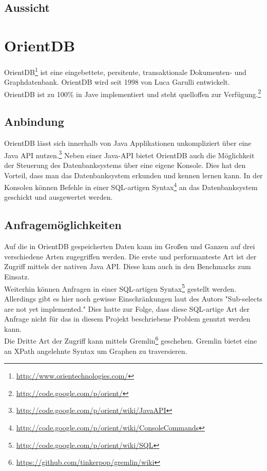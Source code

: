 \documentclass[11pt, a4paper, oneside]{article} %
\begin{document}
\subsection{Aussicht}

\section{OrientDB}

OrientDB\footnote{\url{http://www.orientechnologies.com/}} ist eine eingebettete, persitente, transaktionale Dokumenten- und Graphdatenbank. OrientDB wird seit 1998 von Luca Garulli entwickelt. OrientDB ist zu 100\% in Jave implementiert und steht quelloffen zur Verfügung.\footnote{\url{http://code.google.com/p/orient/}}

\subsection{Anbindung}

OrientDB lässt sich innerhalb von Java Applikationen unkompliziert über eine Java API nutzen.\footnote{\url{http://code.google.com/p/orient/wiki/JavaAPI}} Neben einer Java-API bietet OrientDB auch die Möglichkeit der Steuerung des Datenbanksystems über eine eigene Konsole. Dies hat den Vorteil, dass man das Datenbanksystem erkunden und kennen lernen kann. In der Konsolen können Befehle in einer SQL-artigen Syntax\footnote{\url{http://code.google.com/p/orient/wiki/ConsoleCommands}} an das Datenbanksystem geschickt und ausgewertet werden.

\subsection{Anfragemöglichkeiten}
Auf die in OrientDB gespeicherten Daten kann im Großen und Ganzen auf drei verschiedene Arten zugegriffen werden. Die erste und performanteste Art ist der Zugriff mittels der nativen Java API. Diese kam auch in den Benchmarks zum Einsatz. \\
Weiterhin können Anfragen in einer SQL-artigen Syntax\footnote{\url{http://code.google.com/p/orient/wiki/SQL}} gestellt werden. Allerdings gibt es hier noch gewisse Einschränkungen laut des Autors "Sub-selects are not yet implemented." Dies hatte zur Folge, dass diese SQL-artige Art der Anfrage nicht für das in diesem Projekt beschriebene Problem genutzt werden kann. \\
Die Dritte Art der Zugriff kann mittels Gremlin\footnote{\url{https://github.com/tinkerpop/gremlin/wiki}} geschehen. Gremlin bietet eine an XPath angelehnte Syntax um Graphen zu traversieren.
\end{document}
